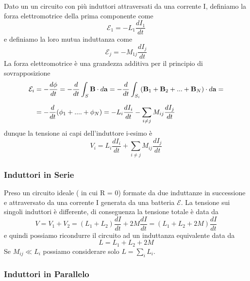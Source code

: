Dato un un circuito con pi\`u induttori attraversati da una corrente I, definiamo la forza elettromotrice della prima componente come 
\begin{equation*}
	\mathcal{E}_1 = - L_1 \frac{dI_1}{dt}
\end{equation*}
e definiamo la loro mutua induttanza come 
\begin{equation*}
	\mathcal{E}_j = -M_{1j} \frac{d I_j}{dt} 
\end{equation*}
La forza elettromotrice \`e una grandezza additiva per il principio di sovrapposizione
\begin{align}
	\mathcal{E}_i &= - \frac{d\phi}{dt} = - \frac{d}{dt} \int_{S} \bold{B} \cdot d\bold{a} = - \frac{d}{dt} \int_{S_i} (\bold{B}_{1} + \bold{B}_{2} + ...+ \bold{B}_{N}) \cdot d \bold{a} = \notag \\ \rule{0pt}{20pt} 
	& = - \frac{d}{dt}(\phi_1 + ....+ \phi_N) = -L_{i} \frac{dI_i}{dt} - \sum_{i \neq j}M_{ij}\frac{dI_j}{dt}
\end{align}
dunque la tensione ai capi dell'induttore i-esimo \`e 
\begin{equation}
	V_i = L_i \frac{d I_i}{dt} + \sum_{i \neq j} M_{ij}\frac{dI_j}{dt}
\end{equation}

\subsubsection{Induttori in Serie}


Preso un circuito ideale ( in cui R = 0) formate da due induttanze in successione e attraversato da una corrente I generata da una batteria $\mathcal{E}$. La tensione sui singoli induttori \`e differente, di conseguenza la tensione totale \`e data da 
\begin{equation*}
	V = V_1 + V_2 = (L_1 + L_2) \frac{dI}{dt} + 2M \frac{dI}{dt} = (L_1 + L_2 + 2M) \frac{dI}{dt}
\end{equation*}
e quindi possiamo ricondurre il circuito ad un induttanza equivalente data da
\begin{equation}
	L = L_1 + L_2 + 2M
\end{equation}
Se $M_{ij} \ll L_i$ possiamo considerare solo $L = \sum_{i} L_i$.

\subsubsection{Induttori in Parallelo}

